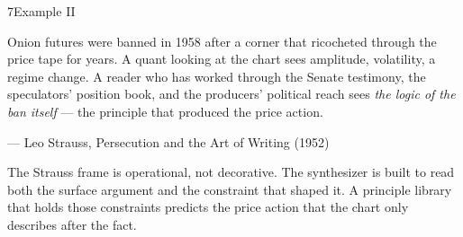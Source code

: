 \documentclass[10pt]{article}
\begin{document}
\begin{slide}{7}{Example II}
  \sliderule

  Onion futures were banned in 1958 after a corner that ricocheted
  through the price tape for years. A quant looking at the chart sees
  amplitude, volatility, a regime change. A reader who has worked
  through the Senate testimony, the speculators' position book, and
  the producers' political reach sees \emph{the logic of the
  ban itself} --- the principle that produced the price action.

  \vspace{0.2in}

  {\sffamily\fontsize{9pt}{11pt}\selectfont\color{amberdim}%
   --- Leo Strauss, Persecution and the Art of Writing (1952)}

  \vspace{0.25in}

  The Strauss frame is operational, not decorative. The synthesizer
  is built to read both the surface argument and the constraint that
  shaped it. A principle library that holds those constraints
  predicts the price action that the chart only describes after the
  fact.
\end{slide}
\end{document}
